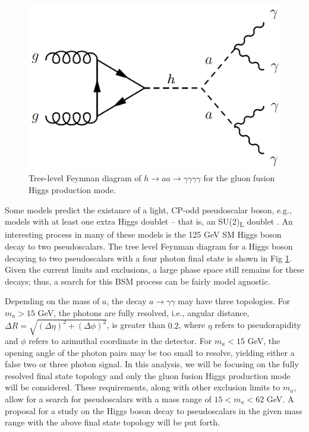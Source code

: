 \documentclass[12pt]{article}
\begin{document}
\begin{figure}
   \centering
   \includegraphics[width=0.4\linewidth]{figures/h4g-feynman-diagram.png}
   \caption{Tree-level Feynman diagram of $h\rightarrow aa \rightarrow \gamma\gamma\gamma\gamma$ for the gluon fusion Higgs production mode.}
   \label{fig:h4g-feynman-diag}
\end{figure}

Some models predict the existance of a light, CP-odd pseudoscalar boson, e.g., models with at least one extra Higgs doublet -- that is, an SU(2)\textsubscript{L} doublet \cite{Curtin_2014}. An interesting process in many of these models is the 125 GeV SM Higgs boson decay to two pseudoscalars. The tree level Feynman diagram for a Higgs boson decaying to two pseudoscalars with a four photon final state is shown in Fig \ref{fig:h4g-feynman-diag}. Given the current limits and exclusions, a large phase space still remains for these decays; thus, a search for this BSM process can be fairly model agnostic.\par

Depending on the mass of $a$, the decay $a\rightarrow \gamma\gamma$ may have three topologies. For $m_{a} > 15$ GeV, the photons are fully resolved, i.e., angular distance, $\Delta R = \sqrt{(\Delta \eta)^2 + (\Delta \phi)^2}$, is greater than $0.2$, where $\eta$ refers to pseudorapidity and $\phi$ refers to azimuthal coordinate in the detector. For $m_{a} < 15$ GeV, the opening angle of the photon pairs may be too small to resolve, yielding either a false two or three photon signal. In this analysis, we will be focusing on the fully resolved final state topology and only the gluon fusion Higgs production mode will be considered. These requirements, along with other exclusion limits to $m_{a}$, allow for a search for pseudoscalars with a mass range of $15 < m_{a} < 62$ GeV. A proposal for a study on the Higgs boson decay to pseudoscalars in the given mass range with the above final state topology will be put forth.\par
\end{document}
